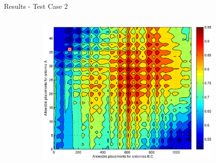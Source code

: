 \documentclass{beamer}
\begin{document}
\begin{frame}{Results - Test Case 2}
    \begin{columns}
        \begin{column}{.4\columnwidth}
            \begin{figure}
                \centering
                \begin{subfigure}{\columnwidth}
                    \includegraphics[width=\columnwidth,height=\columnwidth]{../paper/FIG/tc2_contour}%
                \end{subfigure}\hfill%
            \end{figure}


\end{column}
\end{columns}
\end{frame}
\end{document}
